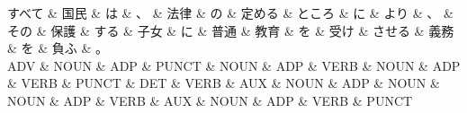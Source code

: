 \documentclass[tikz,border=5pt]{standalone}
\begin{document}
\normalsize
\begin{dependency}[edge unit distance=10.9pt]
    \begin{deptext}[column sep=1em]
        すべて \& 国民 \& は \& 、 \& 法律 \& の \& 定める \& ところ \& に \& より \& 、 \& その \& 保護 \& する \& 子女 \& に \& 普通 \& 教育 \& を \& 受け \& させる \& 義務 \& を \& 負ふ \& 。\\
        ADV \& NOUN \& ADP \& PUNCT \& NOUN \& ADP \& VERB \& NOUN \& ADP \& VERB \& PUNCT \& DET \& VERB \& AUX \& NOUN \& ADP \& NOUN \& NOUN \& ADP \& VERB \& AUX \& NOUN \& ADP \& VERB \& PUNCT\\
    \end{deptext}
\end{dependency}
\end{document}
